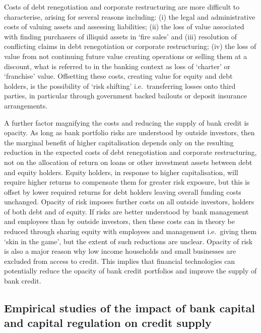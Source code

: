 \documentclass[
]{article}
\begin{document}
Costs of debt renegotiation and corporate restructuring are more difficult to characterise, arising for several reasons including: (i) the legal and administrative costs of valuing assets and assessing liabilities; (ii) the loss of value associated with finding purchasers of illiquid assets in `fire sales' and (iii) resolution of conflicting claims in debt renegotiation or corporate restructuring; (iv) the loss of value from not continuing future value creating operations or selling them at a discount, what is referred to in the banking context as loss of `charter' or `franchise' value. Offsetting these costs, creating value for equity and debt holders, is the possibility of `risk shifting' i.e.~transferring losses onto third parties, in particular through government backed bailouts or deposit insurance arrangements.

A further factor magnifying the costs and reducing the supply of bank credit is opacity. As long as bank portfolio risks are understood by outside investors, then the marginal benefit of higher capitalisation depends only on the resulting reduction in the expected costs of debt renegotiation and corporate restructuring, not on the allocation of return on loans or other investment assets between debt and equity holders. Equity holders, in response to higher capitalisation, will require higher returns to compensate them for greater risk exposure, but this is offset by lower required returns for debt holders leaving overall funding costs unchanged. Opacity of risk imposes further costs on all outside investors, holders of both debt and of equity. If risks are better understood by bank management and employees than by outside investors, then these costs can in theory be reduced through sharing equity with employees and management i.e.~giving them `skin in the game', but the extent of such reductions are unclear. Opacity of risk is also a major reason why low income households and small businesses are excluded from access to credit. This implies that financial technologies can potentially reduce the opacity of bank credit portfolios and improve the supply of bank credit.

\hypertarget{empirical-studies-of-the-impact-of-bank-capital-and-capital-regulation-on-credit-supply}{%
\subsection{Empirical studies of the impact of bank capital and capital regulation on credit supply}\label{empirical-studies-of-the-impact-of-bank-capital-and-capital-regulation-on-credit-supply}}
\end{document}

